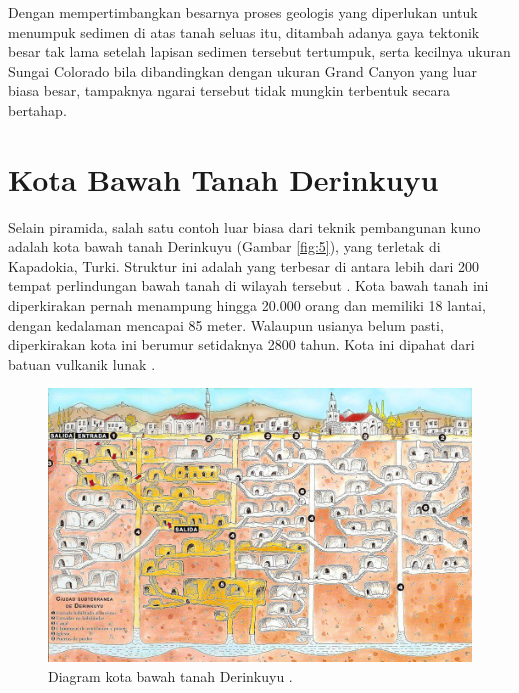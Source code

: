 \documentclass[10pt,twocolumn,letterpaper]{article}
\begin{document}
Dengan mempertimbangkan besarnya proses geologis yang diperlukan untuk menumpuk sedimen di atas tanah seluas itu, ditambah adanya gaya tektonik besar tak lama setelah lapisan sedimen tersebut tertumpuk, serta kecilnya ukuran Sungai Colorado bila dibandingkan dengan ukuran Grand Canyon yang luar biasa besar, tampaknya ngarai tersebut tidak mungkin terbentuk secara bertahap.

\section{Kota Bawah Tanah Derinkuyu}

Selain piramida, salah satu contoh luar biasa dari teknik pembangunan kuno adalah kota bawah tanah Derinkuyu (Gambar \ref{fig:5}), yang terletak di Kapadokia, Turki. Struktur ini adalah yang terbesar di antara lebih dari 200 tempat perlindungan bawah tanah di wilayah tersebut \cite{54}. Kota bawah tanah ini diperkirakan pernah menampung hingga 20.000 orang dan memiliki 18 lantai, dengan kedalaman mencapai 85 meter. Walaupun usianya belum pasti, diperkirakan kota ini berumur setidaknya 2800 tahun. Kota ini dipahat dari batuan vulkanik lunak \cite{52, 53}.

\begin{figure}[b]
\begin{center}
   \includegraphics[width=1\linewidth]{derinkuyu.jpeg}
\end{center}
   \caption{Diagram kota bawah tanah Derinkuyu \cite{56}.}
\label{fig:5}
\label{fig:onecol}
\end{figure}
\end{document}
